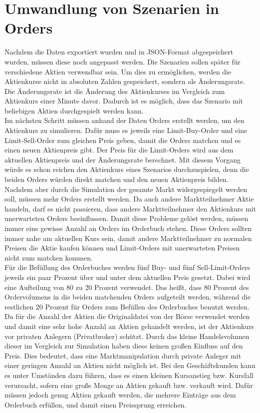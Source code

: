 \section{Umwandlung von Szenarien in Orders}
Nachdem die Daten exportiert wurden und in JSON-Format abgespeichert wurden, müssen diese noch angepasst werden. Die 
Szenarien sollen später für verschiedene Aktien verwendbar sein. Um dies zu ermöglichen, werden die Aktienkurse nicht in 
absoluten Zahlen gespeichert, sondern als Änderungsrate.
Die Änderungsrate ist die Änderung des Aktienkurses im Vergleich zum Aktienkurs einer Minute davor.
Dadurch ist es möglich, dass das Szenario mit beliebigen Aktien durchgespielt werden kann. \\
Im nächsten Schritt müssen anhand der Daten Orders erstellt werden, um den Aktienkurs zu simulieren. Dafür muss es jeweils eine Limit-Buy-Order 
und eine Limit-Sell-Order zum gleichen Preis geben, damit die Orders matchen und es einen neuen Aktienpreis gibt. Der Preis für die 
Limit-Orders wird aus dem aktuellen Aktienpreis und der Änderungsrate berechnet.
Mit diesem Vorgang würde es schon reichen den Aktienkurs eines Szenarios durchzuspielen, denn die beiden Orders würden direkt matchen und den neuen Aktienpreis bilden.
Nachdem aber durch die Simulation der gesamte Markt widergespiegelt werden soll, müssen mehr Orders erstellt werden.
Da auch andere Marktteilnehmer Aktie handeln, darf es nicht passieren, dass andere Marktteilnehmer 
den Aktienkurs mit unerwarteten Orders beeinflussen. Damit diese Probleme gelöst werden, müssen immer eine gewisse Anzahl an Orders 
im Orderbuch stehen. Diese Orders sollten immer nahe am aktuellen Kurs sein, damit andere Marktteilnehmer zu normalen Preisen die 
Aktie kaufen können und Limit-Orders mit unerwarteten Preisen nicht zum matchen kommen. \\
Für die Befüllung des Orderbuches werden fünf Buy- und fünf Sell-Limit-Orders jeweils ein paar Prozent über und unter dem aktuellen 
Preis gesetzt. Dabei wird eine Aufteilung von 80 zu 20 Prozent verwendet.
Das heißt, dass 80 Prozent des Ordervolumens in die beiden matchenden Orders aufgeteilt werden, während die restlichen 20 Prozent für Orders zum Befüllen des Orderbuches benutzt werden.\\
Da für die Anzahl der Aktien die Originaldatei von der Börse verwendet werden und damit eine sehr hohe Anzahl an Aktien gehandelt werden, ist der Aktienkurs vor 
privaten Anlegern (Privatbroker) schützt.
Durch das kleine Handelsvolumen dieser im Vergleich zur Simulation haben diese keinen großen Einfluss auf den Preis. Dies bedeutet, dass eine Marktmanipulation durch private Anleger mit 
einer geringen Anzahl an Aktien nicht möglich ist. Bei den Geschäftskunden kann es unter Umständen dazu führen, dass es einen kleinen Kursanstieg bzw. Kursfall 
verursacht, sofern eine große Menge an Aktien gekauft bzw. verkauft wird.
Dafür müssen jedoch genug Aktien gekauft werden, die mehrere Einträge aus dem Orderbuch 
erfüllen, und damit einen Preissprung erreichen.


